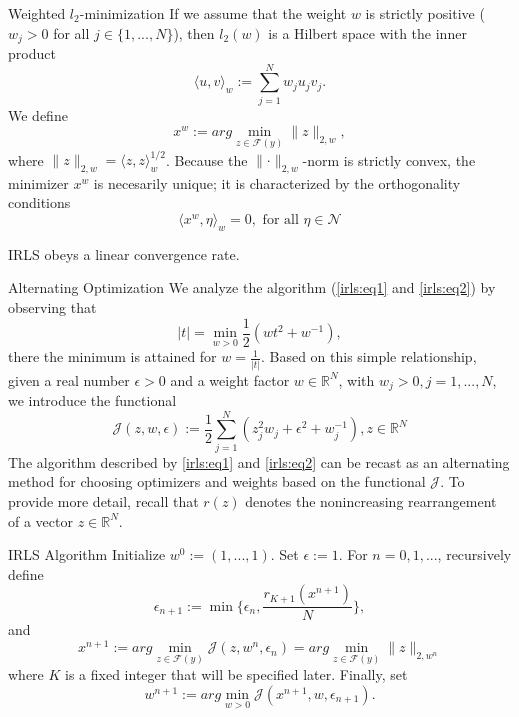 \documentclass[
  english,            %
  aspectratio=169,    %
]{tumbeamer}
\begin{document}
\begin{frame}{Weighted $l_2$-minimization}
If we assume that the weight $w$ is strictly positive ($w_j > 0$ for all $j \in \{1,...,N\}$), then $l_2(w)$ is a Hilbert space with the inner product
\[ \langle u,v \rangle_w := \sum_{j=1}^N w_j u_j v_j .\]
We define
\[ x^w := arg \min_{z \in \mathcal{F}(y)} \lVert z \rVert_{2,w} ,\]
where $\lVert z \rVert_{2,w} = \langle z,z \rangle_w^{1/2}$. Because the $\lVert \cdot \rVert_{2,w}$-norm is strictly convex, the minimizer $x^w$ is necesarily unique; it is characterized by the orthogonality conditions
\[ \langle x^w, \eta \rangle_w = 0, \text{ for all } \eta \in \mathcal{N}\]

\bigskip IRLS obeys a linear convergence rate.
\end{frame}

\begin{frame}{Alternating Optimization}
We analyze the algorithm (\ref{irls:eq1} and \ref{irls:eq2}) by observing that
\[ |t| = \min_{w > 0} \frac{1}{2} (w t^2 + w^{-1}) ,\]
there the minimum is attained for $w = \frac{1}{|t|}$. Based on this simple relationship, given a real number $\epsilon > 0$ and a weight factor $w \in \mathbb{R}^N$, with $w_j > 0, j = 1,...,N$, we introduce the functional
\[ \mathcal{J}(z,w,\epsilon) := \frac{1}{2} \sum_{j=1}^N (z_j^2 w_j + \epsilon^2 + w_j^{-1}), z \in \mathbb{R}^N \]
The algorithm described by \ref{irls:eq1} and \ref{irls:eq2} can be recast as an alternating method for choosing optimizers and weights based on the functional $\mathcal{J}$. To provide more detail, recall that $r(z)$ denotes the nonincreasing rearrangement of a vector $z \in \mathbb{R}^N$.
\end{frame}

\begin{frame}{IRLS Algorithm}
Initialize $w^0 := (1,...,1)$. Set $\epsilon := 1$. For $n = 0,1,...$, recursively define
\begin{equation}
    \epsilon_{n+1} := \min \{ \epsilon_n , \frac{r_{K+1} (x^{n+1})}{N} \},
\end{equation}
and
\begin{equation}
    x^{n+1} := arg \min_{z \in \mathcal{F}(y)} \mathcal{J}(z,w^n,\epsilon_n) = arg \min_{z \in \mathcal{F}(y)} \lVert z \rVert_{2,w^n}
\end{equation}
where $K$ is a fixed integer that will be specified later. Finally, set
\begin{equation}
    w^{n+1} := arg \min_{w>0} \mathcal{J}(x^{n+1},w,\epsilon_{n+1}).
\end{equation}
\end{frame}
\end{document}
